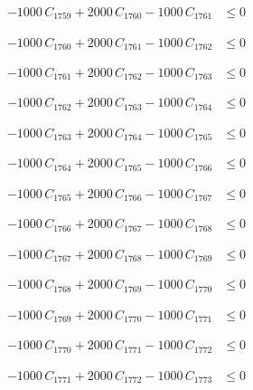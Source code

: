 \documentclass[a4paper,11pt]{article}
\begin{document}
\begin{align}
-1000\,C_{1759} + 2000\,C_{1760} - 1000\,C_{1761} &\leq 0 \nonumber
\end{align}

\begin{align}
-1000\,C_{1760} + 2000\,C_{1761} - 1000\,C_{1762} &\leq 0 \nonumber
\end{align}

\begin{align}
-1000\,C_{1761} + 2000\,C_{1762} - 1000\,C_{1763} &\leq 0 \nonumber
\end{align}

\begin{align}
-1000\,C_{1762} + 2000\,C_{1763} - 1000\,C_{1764} &\leq 0 \nonumber
\end{align}

\begin{align}
-1000\,C_{1763} + 2000\,C_{1764} - 1000\,C_{1765} &\leq 0 \nonumber
\end{align}

\begin{align}
-1000\,C_{1764} + 2000\,C_{1765} - 1000\,C_{1766} &\leq 0 \nonumber
\end{align}

\begin{align}
-1000\,C_{1765} + 2000\,C_{1766} - 1000\,C_{1767} &\leq 0 \nonumber
\end{align}

\begin{align}
-1000\,C_{1766} + 2000\,C_{1767} - 1000\,C_{1768} &\leq 0 \nonumber
\end{align}

\begin{align}
-1000\,C_{1767} + 2000\,C_{1768} - 1000\,C_{1769} &\leq 0 \nonumber
\end{align}

\begin{align}
-1000\,C_{1768} + 2000\,C_{1769} - 1000\,C_{1770} &\leq 0 \nonumber
\end{align}

\begin{align}
-1000\,C_{1769} + 2000\,C_{1770} - 1000\,C_{1771} &\leq 0 \nonumber
\end{align}

\begin{align}
-1000\,C_{1770} + 2000\,C_{1771} - 1000\,C_{1772} &\leq 0 \nonumber
\end{align}

\begin{align}
-1000\,C_{1771} + 2000\,C_{1772} - 1000\,C_{1773} &\leq 0 \nonumber
\end{align}
\end{document}
